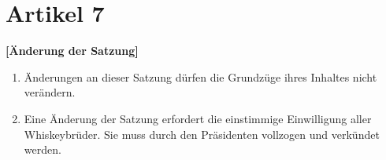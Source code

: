 \documentclass[a4paper,12pt]{scrartcl}
\begin{document}
\section{Artikel 7}
\label{sec:satzungsänderungen}
\textbf{[Änderung der Satzung]}

\begin{enumerate}

\item Änderungen an dieser Satzung dürfen die Grundzüge ihres Inhaltes nicht verändern.

\item Eine Änderung der Satzung erfordert die einstimmige Einwilligung aller Whiskeybrüder. Sie muss
  durch den Präsidenten vollzogen und verkündet werden.

\end{enumerate}
\end{document}
